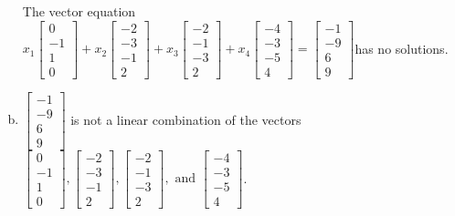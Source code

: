 \begin{exerciseAnswer}
\begin{enumerate}[(a)]
\begin{center}
\begin{minipage}{0.8\textwidth}
 The vector equation \( x_{1} \left[\begin{array}{c}
0 \\
-1 \\
1 \\
0
\end{array}\right] + x_{2} \left[\begin{array}{c}
-2 \\
-3 \\
-1 \\
2
\end{array}\right] + x_{3} \left[\begin{array}{c}
-2 \\
-1 \\
-3 \\
2
\end{array}\right] + x_{4} \left[\begin{array}{c}
-4 \\
-3 \\
-5 \\
4
\end{array}\right] = \left[\begin{array}{c}
-1 \\
-9 \\
6 \\
9
\end{array}\right] \)has no solutions.
\end{minipage}\end{center}
    
\item 

\( \left[\begin{array}{c}
-1 \\
-9 \\
6 \\
9
\end{array}\right] \) is not a linear combination of the vectors \( \left[\begin{array}{c}
0 \\
-1 \\
1 \\
0
\end{array}\right] , \left[\begin{array}{c}
-2 \\
-3 \\
-1 \\
2
\end{array}\right] , \left[\begin{array}{c}
-2 \\
-1 \\
-3 \\
2
\end{array}\right] , \text{ and } \left[\begin{array}{c}
-4 \\
-3 \\
-5 \\
4
\end{array}\right] \). 


\end{enumerate}
    
\end{exerciseAnswer}
    
